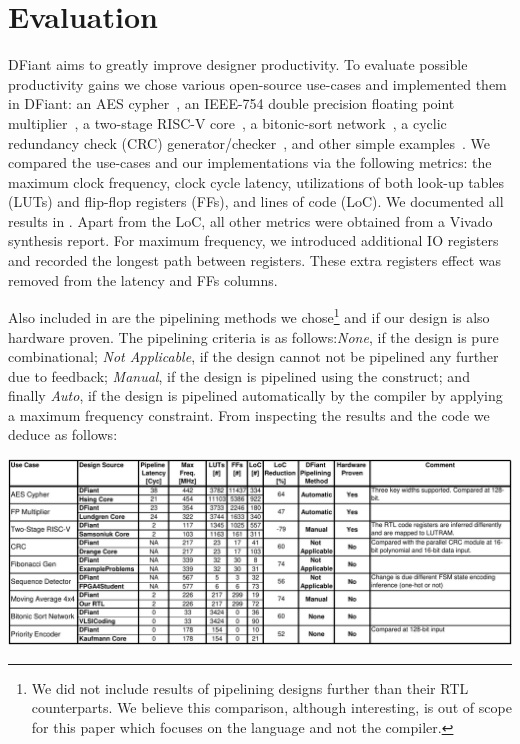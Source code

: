\section{Evaluation}
\label{sec:evaluation}
DFiant aims to greatly improve designer productivity. To evaluate possible productivity gains we chose various open-source use-cases and implemented them in DFiant: an AES cypher~\cite{hsing2013aes}, an IEEE-754 double precision floating point multiplier~\cite{lundgren2014open}, a two-stage RISC-V core~\cite{samsoniuk2019riscv}, a bitonic-sort network~\cite{bitsortvhdl}, a cyclic redundancy check (CRC) generator/checker~\cite{drange2016crc}, and other simple examples~\cite{pedroni2008digital, fibgenvhdl, seqdetvhdl}. We compared the use-cases and our implementations via the following metrics: the maximum clock frequency, clock cycle latency, utilizations of both look-up tables (LUTs) and flip-flop registers (FFs), and lines of code (LoC). We documented all results in . Apart from the LoC, all other metrics were obtained from a Vivado synthesis report. For maximum frequency, we introduced additional IO registers and recorded the longest path between registers. These extra registers effect was removed from the latency and FFs columns.  

Also included in  are the pipelining methods we chose\footnote{We did not include results of pipelining designs further than their RTL counterparts. We believe this comparison, although interesting, is out of scope for this paper which focuses on the language and not the compiler.} and if our design is also hardware proven. The pipelining criteria is as follows:\emph{None}, if the design is pure combinational; \emph{Not Applicable}, if the design cannot not be pipelined any further due to feedback; \emph{Manual}, if the design is pipelined using the  construct; and finally \emph{Auto}, if the design is pipelined automatically by the compiler by applying a maximum frequency constraint. From inspecting the results and the code we deduce as follows:


\begin{table}[t]
  \centering
	\captionsetup{justification=centering}
	\label{tbl:Results}
	\includegraphics[width=0.9\linewidth]{graphics/Results.pdf}
\end{table}


